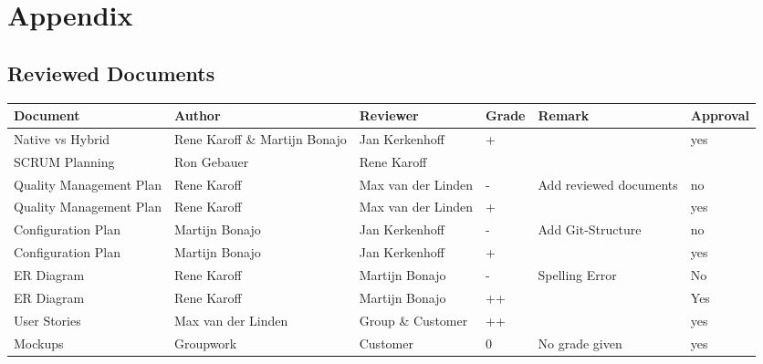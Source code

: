 \begin{sidewaystable}
	\section*{Appendix}
	\subsection*{Reviewed Documents}
		\begin{longtable}[htbp]{ l p{3.7cm} *{2}{l} p{3.7cm} l}
			\textbf{Document} & \textbf{Author} & \textbf{Reviewer} & \textbf{Grade} & \textbf{Remark} & \textbf{Approval}\\ \hline
			Native vs Hybrid & Rene Karoff \& Martijn Bonajo & Jan Kerkenhoff &+& & yes\\
			SCRUM Planning & Ron Gebauer & Rene Karoff & & & \\
			Quality Management Plan & Rene Karoff & Max van der Linden &-&  Add reviewed documents& no \\
			Quality Management Plan & Rene Karoff & Max van der Linden &+& & yes \\
			Configuration Plan & Martijn Bonajo & Jan Kerkenhoff &-& Add Git-Structure & no\\
			Configuration Plan & Martijn Bonajo & Jan Kerkenhoff &+&  & yes\\
			ER Diagram & Rene Karoff & Martijn Bonajo & - & Spelling Error& No\\
			ER Diagram & Rene Karoff & Martijn Bonajo &++&& Yes\\
			User Stories & Max van der Linden & Group \& Customer & ++ & & yes \\
			Mockups & Groupwork & Customer & 0 & No grade given &  yes\\
		\end{longtable}
\end{sidewaystable}
